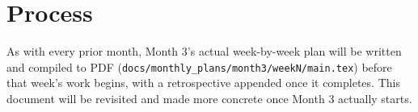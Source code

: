 \documentclass[11pt]{article}
\begin{document}
\section*{Process}
As with every prior month, Month 3's actual week-by-week plan will be
written and compiled to PDF (\texttt{docs/monthly\_plans/month3/weekN/main.tex})
before that week's work begins, with a retrospective appended once it
completes. This document will be revisited and made more concrete once
Month 3 actually starts.
\end{document}
